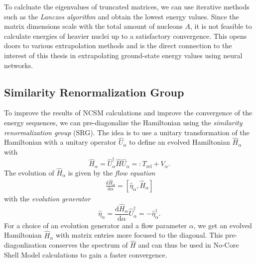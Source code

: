 To calcluate the eigenvalues of truncated matrices, we can use iterative methods such as the \textit{Lanczos algorithm} and obtain the lowest energy values. Since the matrix dimensions scale with the total amount of nucleons $A$, it is not feasible to calculate energies of heavier nuclei up to a satisfactory convergence. This opens doors to various extrapolation methods and is the direct connection to the interest of this thesis in extrapolating ground-state energy values using neural networks.

\subsection{Similarity Renormalization Group}
To improve the results of NCSM calculations and improve the convergence of the energy sequences, we can pre-diagonalize the Hamiltonian using the \textit{similarity renormalization group} (SRG). The idea is to use a unitary transformation of the Hamiltonian with a unitary operator $\hat{U}_\alpha$ to define an evolved Hamiltonian $\hat{H}_\alpha$ with
\begin{equation}
  \hat{H}_\alpha = \hat{U}_\alpha^\dagger \hat{H} \hat{U}_\alpha =: T_\mathrm{rel} + V_\alpha.
\end{equation}
The evolution of $\hat{H}_\alpha$ is given by the \textit{flow equation}
\begin{align}
  \frac{\mathrm{d}\hat{H}_\alpha}{\mathrm{d}\alpha} = [\hat{\eta}_\alpha, \hat{H}_\alpha]
\end{align}
with the \textit{evolution generator}
\begin{equation}
  \hat{\eta}_\alpha = \frac{\mathrm{d}\hat{H}_\alpha}{\mathrm{d}\alpha} \hat{U}^\dagger_\alpha = -\hat{\eta}_\alpha^\dagger.
\end{equation}
For a choice of an evolution generator and a flow parameter $\alpha$, we get an evolved Hamiltonian $\hat{H}_\alpha$ with matrix entries more focused to the diagonal. This pre-diagonlization conserves the spectrum of $\hat{H}$ and can thus be used in No-Core Shell Model calculations to gain a faster convergence.
